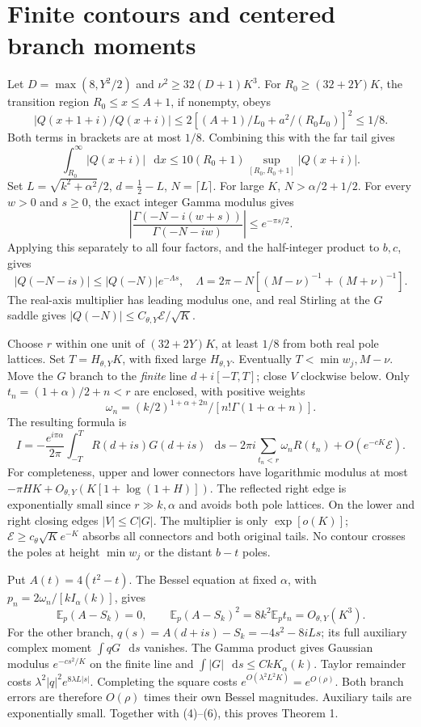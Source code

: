 \documentclass[11pt,a4paper]{article}
\newcommand{\E}{\mathcal E}
\newcommand{\dd}{\mathop{}\!\mathrm d}
\begin{document}
\newpage
\section{Finite contours and centered branch moments}
Let \(D=\max(8,Y^2/2)\) and \(\nu^2\ge32(D+1)K^3\).
For \(R_0\ge(32+2Y)K\), the transition region
\(R_0\le x\le A+1\), if nonempty, obeys
\[
 |Q(x+1+i)/Q(x+i)|
 \le2[(A+1)/L_0+a^2/(R_0L_0)]^2\le1/8 .
\]
Both terms in brackets are at most \(1/8\).
Combining this with the far tail gives
\[
 \int_{R_0}^{\infty}|Q(x+i)|\,\dd x
 \le10(R_0+1)\sup_{[R_0,R_0+1]}|Q(x+i)|.
\]
Set \(L=\sqrt{k^2+\alpha^2}/2\), \(d=\tfrac12-L\), \(N=\lceil L\rceil\).
For large \(K\), \(N>\alpha/2+1/2\). For every \(w>0\) and \(s\ge0\),
the exact integer Gamma modulus gives
\[
 \left|\frac{\Gamma(-N-i(w+s))}{\Gamma(-N-iw)}\right|
 \le e^{-\pi s/2}.
\]
Applying this separately to all four factors, and the half-integer
product to \(b,c\), gives
\[
 |Q(-N-is)|\le|Q(-N)|e^{-\Lambda s},\quad
 \Lambda=2\pi-N[(M-\nu)^{-1}+(M+\nu)^{-1}].
\]
The real-axis multiplier has leading modulus one, and real Stirling
at the \(G\) saddle gives \(|Q(-N)|\le C_{\theta,Y}\E/\sqrt K\).

Choose \(r\) within one unit of \((32+2Y)K\), at least \(1/8\)
from both real pole lattices. Set \(T=H_{\theta,Y}K\), with fixed large
\(H_{\theta,Y}\). Eventually \(T<\min w_j,M-\nu\).
Move the \(G\) branch to the \emph{finite} line \(d+i[-T,T]\);
close \(V\) clockwise below. Only
\(t_n=(1+\alpha)/2+n<r\) are enclosed, with positive weights
\[
 \omega_n=(k/2)^{1+\alpha+2n}/[n!\Gamma(1+\alpha+n)] .
\]
The resulting formula is
\[
 I=-\frac{e^{i\pi\alpha}}{2\pi}\int_{-T}^{T}R(d+is)G(d+is)\,\dd s
       -2\pi i\sum_{t_n<r}\omega_nR(t_n)+O(e^{-cK}\E).              \tag{6}
\]
For completeness, upper and lower connectors have logarithmic modulus
at most \(-\pi HK+O_{\theta,Y}(K[1+\log(1+H)])\).
The reflected right edge is exponentially small since \(r\gg k,\alpha\)
and avoids both pole lattices. On the lower and right closing edges
\(|V|\le C|G|\). The multiplier is only \(\exp[o(K)]\);
\(\E\ge c_\theta\sqrt K e^{-K}\) absorbs all connectors and both
original tails. No contour crosses the poles at height \(\min w_j\)
or the distant \(b-t\) poles.

Put \(A(t)=4(t^2-t)\).
The Bessel equation at fixed \(\alpha\), with
\(p_n=2\omega_n/[kI_\alpha(k)]\), gives
\[
 \mathbb E_p(A-S_k)=0,\qquad
 \mathbb E_p(A-S_k)^2=8k^2\mathbb E_p t_n=O_{\theta,Y}(K^3).
\]
For the other branch, \(q(s)=A(d+is)-S_k=-4s^2-8iLs\);
its full auxiliary complex moment \(\int qG\,\dd s\) vanishes.
The Gamma product gives Gaussian modulus \(e^{-cs^2/K}\) on the
finite line and \(\int|G|\,\dd s\le CkK_\alpha(k)\).
Taylor remainder costs \(\lambda^2|q|^2e^{8\lambda L|s|}\).
Completing the square costs \(e^{O(\lambda^2L^2K)}=e^{O(\rho)}\).
Both branch errors are therefore \(O(\rho)\) times their own Bessel
magnitudes. Auxiliary tails are exponentially small. Together with
(4)--(6), this proves Theorem 1.
\end{document}
